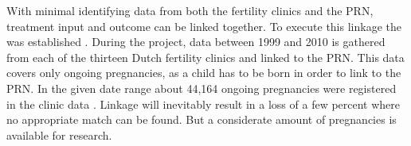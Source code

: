 With minimal identifying data from both the fertility clinics and the PRN, treatment input and outcome can be linked together.
To execute this linkage the \project{} was established \silvia{[reference?]}.
During the project, data between 1999 and 2010 is gathered from each of the thirteen Dutch fertility clinics and linked to the PRN.
This data covers only ongoing pregnancies, as a child has to be born in order to link to the PRN.
In the given date range about 44,164 ongoing pregnancies were registered in the clinic data \cite{ivfReportNVOG}.
Linkage will inevitably result in a loss of a few percent where no appropriate match can be found.
But a considerate amount of pregnancies is available for research.
